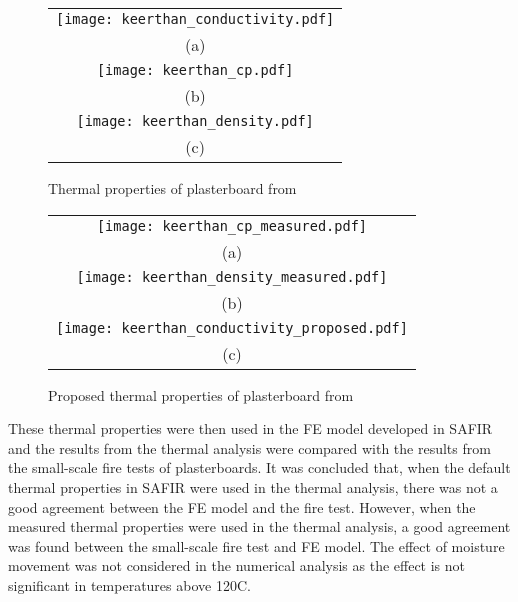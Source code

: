 \begin{figure}[htbp]
	\centering
		\begin{tabular}{c}
			\texttt{[image: keerthan\_conductivity.pdf]} \\
			(a) \\
			\texttt{[image: keerthan\_cp.pdf]} \\
			(b) \\ 
			\texttt{[image: keerthan\_density.pdf]} \\
			(c) \\
		\end{tabular} 
		\caption{Thermal properties of plasterboard from }
		\label{fig:keerthan_pbprop}
\end{figure}

\begin{figure}[htbp]
	\centering
		\begin{tabular}{c}
			\texttt{[image: keerthan\_cp\_measured.pdf]} \\
			(a) \\
			\texttt{[image: keerthan\_density\_measured.pdf]} \\
			(b) \\ 
			\texttt{[image: keerthan\_conductivity\_proposed.pdf]} \\
			(c) \\
		\end{tabular} 
		\caption{Proposed thermal properties of plasterboard from }
			\label{fig:keerthan_measured}

	\end{figure}

These thermal properties were then used in the FE model developed in SAFIR and the results from the thermal analysis were compared with the results from the small-scale fire tests of plasterboards. It was concluded that, when the default thermal properties in SAFIR were used in the thermal analysis, there was not a good agreement between the FE model and the fire test. However, when the measured thermal properties were used in the thermal analysis, a good agreement was found between the small-scale fire test and FE model. The effect of moisture movement was not considered in the numerical analysis as the effect is not significant in temperatures above 120\degree C.

